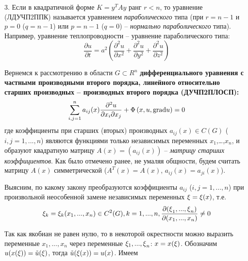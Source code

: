 3. Если в квадратичной форме $K=y^{T} Ay$ ранг $r<n$, то уравнение (ЛДУЧП2ППК) называется уравнением \textit{параболического} типа (при $r=n-1$ и $p=0$ ($q=n-1$) или $p=n-1$ ($q=0$) -- \textit{нормально параболического} типа). Например, уравнение теплопроводности -- уравнение параболического типа:
\[\frac{\partial u}{\partial t} =a^{2} \left(\frac{\partial ^{2} u}{\partial x^{2} } +\frac{\partial ^{2} u}{\partial y^{2} } +\frac{\partial ^{2} u}{\partial z^{2} } \right)\]

Вернемся к рассмотрению в области $G\subset R^{n} $ \textbf{дифференциального уравнения с частными производными второго порядка, линейного относительно старших производных -- производных второго порядка (ДУЧП2ПЛОСП):}
\[\sum _{i,j=1}^{n}a_{ij} (x)\frac{\partial ^{2} u}{\partial x_{i} \partial x_{j} }  +\Phi \left(x,u,{\rm grad}u\right)=0\]
где коэффициенты при старших (вторых) производных $a_{ij} (x)\in C(G)$ ($i,j=1,...,n$) являются функциями только независимых переменных $x_{1} $,{\dots},$x_{n} $, и образуют квадратную матрицу $A(x)=(a_{ij} (x))$ -- \textit{матрицу старших коэффициентов}. Как было отмечено ранее, не умаляя общности, будем считать матрицу $A(x)$ симметрической ($A^{T} (x)=A(x)$, $a_{ij} (x)=a_{ji} (x)$).

\noindent

Выясним, по какому закону преобразуются коэффициенты $a_{ij} $ ($i,j=1,...,n$) при произвольной неособенной замене независимых переменных ${\rm \xi }={\rm \xi }(x)$, т.е.
\[{\rm \xi }_{k} ={\rm \xi }_{k} (x_{1} ,...,x_{n} )\in C^{2} (G),   k=1,...,n,   \frac{\partial {\rm (\xi }_{1} {\rm ,...,\xi }_{n} {\rm )}}{\partial (x_{1} ,...,x_{n} )} \ne {\rm 0}\]

Так как якобиан не равен нулю, то в некоторой окрестности можно выразить переменные $x_{1} ,...,x_{n} $ через переменные ${\rm \xi }_{1} {\rm ,...,\xi }_{n} $: $x=x({\rm \xi })$. Обозначим $u(x({\rm \xi }))=\tilde{u}({\rm \xi })$, тогда $\tilde{u}({\rm \xi (}x{\rm )})=u(x)$. Имеем

